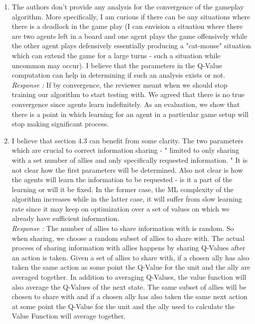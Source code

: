 \begin{enumerate}
\item The authors don't provide any analysis for the convergence of the gameplay algorithm. More specifically, I am curious if there can be any situations where there is a deadlock in the game play (I can envision a situation where there are two agents left in a board and one agent plays the game offensively while the other agent plays defensively essentially producing a "cat-mouse" situation which can extend the game for a large turns - such a situation while uncommon may occur). I believe that the parameters in the Q-Value computation can help in determining if such an analysis exists or not. 
\\{\it Response : } If by convergence, the reviewer meant when we should stop training our algorithm to start testing with. We agreed that there is no true convergence since agents learn indefinitely. As an evaluation, we show that there is a point in which learning for an agent in a particular game setup will stop making significant process.

\item I believe that section 4.3 can benefit from some clarity. The two parameters which are crucial to correct information sharing - " limited to only sharing with a set number of allies and only specifically requested information. " It is not clear how the first parameters will be determined. Also not clear is how the agents will learn the information to be requested - is it a part of the learning or will it be fixed. In the former case, the ML complexity of the algorithm increases while in the latter case, it will suffer from slow learning rate since it may keep on optimization over a set of values on which we already have sufficient information. 
\\{\it Response : } The number of allies to share information with is random. So when sharing, we choose a random subset of allies to share with. The actual process of sharing information with allies happens by sharing Q-Values after an action is taken. Given a set of allies to share with, if a chosen ally has also taken the same action as some point the Q-Value for the unit and the ally are averaged together. In addition to averaging Q-Values, the value function will also average the Q-Values of the next state. The same subset of allies will be chosen to share with and if a chosen ally has also taken the same next action at some point the Q-Value for the unit and the ally used to calculate the Value Function will average together.

\end{enumerate}

